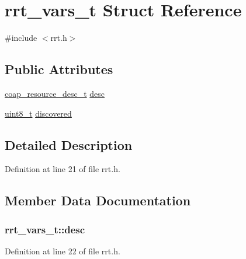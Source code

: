 \hypertarget{structrrt__vars__t}{}\section{rrt\+\_\+vars\+\_\+t Struct Reference}
\label{structrrt__vars__t}


{\ttfamily \#include $<$rrt.\+h$>$}

\subsection*{Public Attributes}
\begin{DoxyCompactItemize}
\item 
\hyperlink{structcoap__resource__desc__t}{coap\+\_\+resource\+\_\+desc\+\_\+t} \hyperlink{structrrt__vars__t_ac4d8e84c9b503d68900b4c268425076d}{desc}
\item 
\hyperlink{_p_e___types_8h_aba7bc1797add20fe3efdf37ced1182c5}{uint8\+\_\+t} \hyperlink{structrrt__vars__t_a0fbca64481b98d2b323b7e8cf6a2652e}{discovered}
\end{DoxyCompactItemize}


\subsection{Detailed Description}


Definition at line 21 of file rrt.\+h.



\subsection{Member Data Documentation}
\subsubsection[{\texorpdfstring{desc}{desc}}]{ rrt\+\_\+vars\+\_\+t\+::desc}\hypertarget{structrrt__vars__t_ac4d8e84c9b503d68900b4c268425076d}{}\label{structrrt__vars__t_ac4d8e84c9b503d68900b4c268425076d}


Definition at line 22 of file rrt.\+h.

